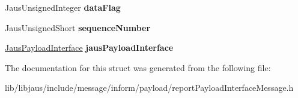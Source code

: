 \begin{DoxyCompactItemize}
\item 
\hypertarget{struct_report_payload_interface_message_struct_a07ccd3d96b638bd02061a68e12e4295e}{\-Jaus\-Unsigned\-Integer {\bfseries data\-Flag}}\label{struct_report_payload_interface_message_struct_a07ccd3d96b638bd02061a68e12e4295e}

\item 
\hypertarget{struct_report_payload_interface_message_struct_a4ef968f3c32a27e26d5e2339f2291b7e}{\-Jaus\-Unsigned\-Short {\bfseries sequence\-Number}}\label{struct_report_payload_interface_message_struct_a4ef968f3c32a27e26d5e2339f2291b7e}

\item 
\hypertarget{struct_report_payload_interface_message_struct_ad29067686651a03f0142196de2665cc0}{\hyperlink{struct_jaus_payload_interface_struct}{\-Jaus\-Payload\-Interface} {\bfseries jaus\-Payload\-Interface}}\label{struct_report_payload_interface_message_struct_ad29067686651a03f0142196de2665cc0}

\end{DoxyCompactItemize}


\-The documentation for this struct was generated from the following file\-:\begin{DoxyCompactItemize}
\item 
lib/libjaus/include/message/inform/payload/report\-Payload\-Interface\-Message.\-h\end{DoxyCompactItemize}
